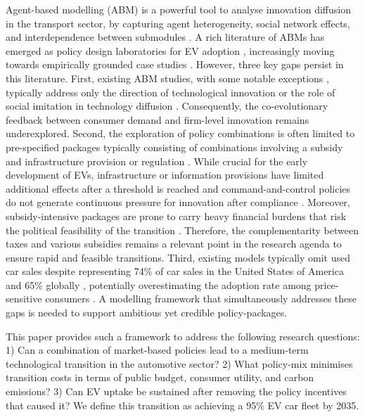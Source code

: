 \documentclass[12pt]{article}
\begin{document}
Agent-based modelling (ABM) is a powerful tool to analyse innovation diffusion in the transport sector, by capturing agent heterogeneity, social network effects, and interdependence between submodules \citep{Kiesling2012,Zhang2017Empirical}. A rich literature of ABMs has emerged as policy design laboratories for EV adoption \citep{Fadiran2020Review, Maybury2022ReviewEV,mehdizadeh2022systematic,domarchi2023electric}, increasingly moving towards empirically grounded case studies  \citep{Zhang2017Empirical,ledna2022support,xu2025influence,guven2026assessing}. However, three key gaps persist in this literature. First, existing ABM studies, with some notable exceptions \citep{dijk2013incorporating}, typically address only the direction of technological innovation \citep{windrum2009consumer,sun2019effects} or the role of social imitation in technology diffusion \citep{mccoy2014consumer,Silvia2016EVABM,li2019evolutionary,FENG2019196,he2020integration,ning2020incorporating,lee2021evaluating,zhang2022market}. Consequently, the co-evolutionary feedback between consumer demand and firm-level innovation remains underexplored. Second, the exploration of policy combinations is often limited to pre-specified packages typically consisting of combinations involving a subsidy and infrastructure provision or regulation \citep{greene2014public,Broadbent2022Accelerating,abas2024modeling,moralejo_pinas_electric_2025,cannavacciuolo_agent-based_2025,guven2026assessing,yang_impacts_2026}. While crucial for the early development of EVs, infrastructure or information provisions have limited additional effects after a threshold is reached \citep{springel_network_2021} and command-and-control policies do not generate continuous pressure for innovation after compliance \citep{Gebhardt2026}. Moreover, subsidy-intensive packages are prone to carry heavy financial burdens that risk the political feasibility of the transition \citep{Sheldon2022Evaluating,Shang2024Subsidy}. Therefore, the complementarity between taxes and various subsidies remains a relevant point in the research agenda to ensure rapid and feasible transitions. Third, existing models typically omit used car sales despite representing 74\% of car sales in the United States of America and 65\% globally \citep{360ResearchReports2026UsedCars}, potentially overestimating the adoption rate among price-sensitive consumers \citep{Muehlegger2018Understanding}. A modelling framework that simultaneously addresses these gaps is needed to support ambitious yet credible policy-packages.

This paper provides such a framework to address the following research questions: 1) Can a combination of market-based policies lead to a medium-term technological transition in the automotive sector? 2) What policy-mix minimises transition costs in terms of public budget, consumer utility, and carbon emissions? 3) Can EV uptake be sustained after removing the policy incentives that caused it? We define this transition as achieving a 95\% EV car fleet by 2035.
\end{document}
